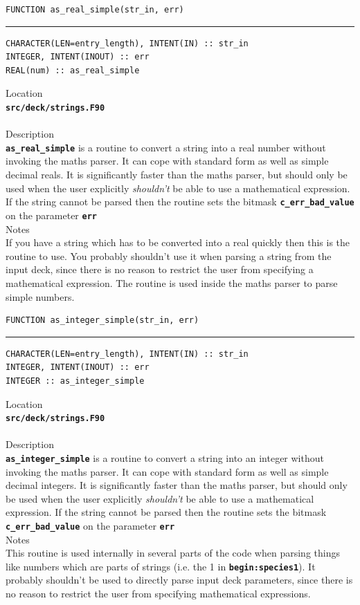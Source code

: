 \documentclass[12pt,a4paper]{article}
\newcommand{\HRule}{\rule{\linewidth}{0.5mm}}
\newcommand{\inlinecode}[1]{{\color{warwickred} \bf\texttt{#1}}}
\newcommand{\codedef}{\begin{Verbatim}[formatcom=\color{warwickred},fontsize=\Large,hfuzz=0pt]}
\newcommand{\coderule}{
{\color{warwickred}\vspace{-0.5cm}\HRule}
\codedef}
\begin{document}
\pagebreak
\codedef
FUNCTION as_real_simple(str_in, err)
\end{Verbatim}
\coderule
CHARACTER(LEN=entry_length), INTENT(IN) :: str_in
INTEGER, INTENT(INOUT) :: err
REAL(num) :: as_real_simple
\end{Verbatim}
\vspace{1cm}
{\Large Location\\}
\inlinecode{src/deck/strings.F90}\\
\\[0.5cm]
{\Large Description\\}
\inlinecode{as\_real\_simple} is a routine to convert a string into a real number
without invoking the maths parser. It can cope with standard form as well as
simple decimal reals. It is significantly faster than the maths parser, but
should only be used when the user explicitly {\it shouldn't} be able to use a
mathematical expression. If the string cannot be parsed then the routine sets
the bitmask \inlinecode{c\_err\_bad\_value} on the parameter \inlinecode{err}
\\[0.5cm]
{\Large Notes\\}
If you have a string which has to be converted into a real quickly then this is
the routine to use. You probably shouldn't use it when parsing a string from
the input deck, since there is no reason to restrict the user from specifying a
mathematical expression. The routine is used inside the maths parser to parse
simple numbers.

\pagebreak
\codedef
FUNCTION as_integer_simple(str_in, err)
\end{Verbatim}
\coderule
CHARACTER(LEN=entry_length), INTENT(IN) :: str_in
INTEGER, INTENT(INOUT) :: err
INTEGER :: as_integer_simple
\end{Verbatim}
\vspace{1cm}
{\Large Location\\}
\inlinecode{src/deck/strings.F90}\\
\\[0.5cm]
{\Large Description\\}
\inlinecode{as\_integer\_simple} is a routine to convert a string into an integer
without invoking the maths parser. It can cope with standard form as well as
simple decimal integers. It is significantly faster than the maths parser, but
should only be used when the user explicitly {\it shouldn't} be able to use a
mathematical expression. If the string cannot be parsed then the routine sets
the bitmask \inlinecode{c\_err\_bad\_value} on the parameter \inlinecode{err}
\\[0.5cm]
{\Large Notes\\}
This routine is used internally in several parts of the code when parsing
things like numbers which are parts of strings (i.e. the 1 in
\inlinecode{begin:species1}). It probably shouldn't be used to directly parse
input deck parameters, since there is no reason to restrict the user from
specifying mathematical expressions.
\end{document}

